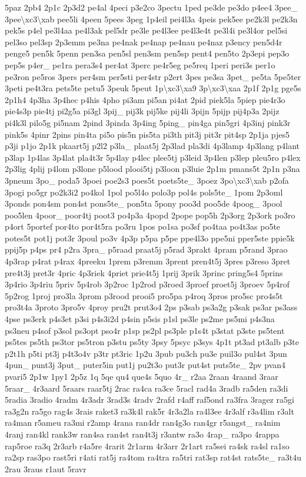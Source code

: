 \begin{DoxyCompactItemize}
5paz 2pb4 2p1c 2p3d2 pe4al 4peci p3e2co 3pectu 1ped pe3de pe3do p4ee4 3pee\-\_\- 3pee\textbackslash{}xc3\textbackslash{}xab pee5li 4peen 5pees 3peg 1p4eil pei4l3a 4peis pek5ee pe2k3l pe2k3n pek5s p4el pe3l4aa pe4l3ak pel5dr pe3le pe4l3ee pe4l3e4t pe3l4i pe3l4or pel5si pel3so pel3sp 2p3emm pe3na pe4nak pe4nap pe4nau pe4naz p3ency pen5d4r penge5 pen5k 5penn pen3sa pen5sl pen3sm pen5sp pent4 pen5to 2p3epi pep3o pep5s p4er\-\_\- pe1ra pera3s4 per4at 3perc pe4r5eg pe5req 1peri peri3s per1o pe3ron pe5ros 3pers per4sm per5sti per4str p2ert 3pes pe3sa 3pet\-\_\- pe5ta 5pe5ter 3peti pe4t3ra pets5te petu5 3peuk 5peut 1p\textbackslash{}xc3\textbackslash{}xa9 3p\textbackslash{}xc3\textbackslash{}xaa 2p1f 2p1g pge5s 2p1h4 4p3ha 3p4hec p4his 4pho pi3am pi5an pi4at 2pid piek5la 5piep pie4r3o pie4s3p pie4tj pi2g5a pi3gl 3pij\-\_\- pij3k pij5ke pij4li 3pijn 5pijp pij4p3a 2pijz pi4k3l pilo5g pi5nam 2pind 3pinda 3p4ing 5ping\-\_\- pin4ga pin5gri 4p3inj pink3r pink5s 4pinr 2pins pin4ta pi5o pis5n pis5ta pi3th pit3j pit3r pit4sp 2p1ja pjes5 p3ji p1jo 2p1k pkaart5j p2l2 p3la\-\_\- plaat5j 2p3lad pla3di 4p3lamp 4p3lang p4lant p3lap 1p4las 3p4lat pla4t3r 5p4lay p4lec plee5tj p3leid 3p4len p3lep pleu5ro p4lex 2p3lig 4plij p4lom p3lone p5lood plooi5tj p3loon p3luie 2p1m pmans5t 2p1n p3na 3pneum 3po\-\_\- poda5 3poei poe2s3 poes5t poets5te\-\_\- 3poez 3po\textbackslash{}xc3\textbackslash{}xab p2ofa 3pogi po5gr po2k3i2 po4kol 1pol po5l4o polo3p pol4s pols5te\-\_\- 1pom 2p3oml 3ponds pon4sm pon4st pons5te\-\_\- pon5ta 5pony poo3d poo5de 4poog\-\_\- 3pool poo5len 4poor\-\_\- poor4tj poot3 po4p3a 4popd 2pope pop5h 2p3org 2p3ork po3ro p4ort 5portef por4to por4t5ra po3ru 1pos po1sa po3sf po4taa po4t3as po5te potes5t pot1j pot3r 3poul po3v 4p3p p5pa p5pe ppe4l3o ppe5ni pper5ste ppie5k ppij5p p4ps pr4 p2ra 3pra\-\_\- p5raad praat5j p5rad 3prakt 4pram p5rand 3prao 4p3rap p4rat p4rax 4preeku 1prem p3remm 3prent pren4t5j 3pres p3reso 3pret pre4t3j pret3r 4pric 4p3riek 4priet prie4t5j 1prij 3prik 3princ pring5s4 5prins 3p4rio 3p4riu 5priv 5p4rob 3p2roc 1p2rod p3roed 3proef proet5j 3proev 5p4rof 5p2rog 1proj pro3la 3prom p3rood prooi5 pro5pa p4roq 3pros pro5sc pro4s5t pro3t4a 3proto 3pro5v 4proy pru2t prut3o4 2ps p3sab ps3a2g p3sak ps3ar ps3ass 4pse ps3erk p4s3et p3si p4s3i2d p4sin p5sis p1sl ps3le ps2me ps5mi p4s3na ps3neu p4sof p3sol ps3opt pso4r p1sp ps2pl ps3ple p1s4t p3stat p3ste ps5tent ps5tes ps5th ps3tor ps5tron p3stu ps5ty 3psy 5psyc p3sys 4p1t pt3ad pt3alb p3te p2t1h p5ti pt3j p4t3o4v p3tr pt3ric 1p2u 3pub pu3ch pu3e puil3o pul4st 3pun 4pun\-\_\- punt3j 3put\-\_\- puter5in put1j pu2t3o put3r put4st puts5te\-\_\- 2pv pvan4 pvari5 2p1w 1py1 2p5z 1q 5qe qu4 que4s 5quo 4r\-\_\- r2aa 2raan 4raand 3raar 5raar\-\_\- 4r3aard 5raars raar5tj 2rac ra4ca ra3ce 5racl rad4a 3radb ra5den ra3di 5radia 3radio 4radm 4r3adr 3rad3s 4radv 2rafd r4aff raf5ond ra3fra 3ragez ra5gi ra3g2n ra5go rag4s 3rais raket3 ra3k4l rak5r 4r3a2la ra4l3ee 4r3alf r3a4lim r3alt ra4man r5ameu ra3mi r2amp 4rana ran4dr ran4g3o ran4gr r5angst\-\_\- ra4nim 4ranj ran4kl rank3w ran4sa ran4st ran4t3j r3antw ra3o 4rap\-\_\- ra3po 4rappa rap5roe ra3q 2r3arb r4a5re 4rarit 2r1arm 4r3arr 2r1art ra5sei ra4sk ra4sl ra1so ra2sp ras3po rast5ri r4ati rat5j ra4tom ra4tra ra5tri rat3sp rat4st rats5te\-\_\- ra3t4u 2rau 3raus r1aut 5ravr 
\end{DoxyCompactItemize}

